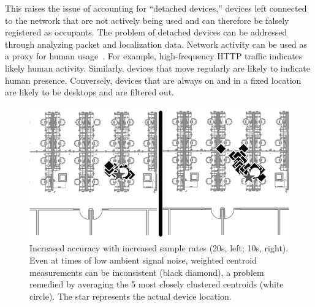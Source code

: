 This raises the issue of accounting for ``detached devices,'' devices left connected to the network that are not actively being used and can therefore be falsely registered as occupants. The problem of detached devices can be addressed through analyzing packet and localization data. Network activity can be used as a proxy for human usage~\cite{Nedevschi2009}. For example, high-frequency HTTP traffic indicates likely human activity. Similarly, devices that move regularly are likely to indicate human presence. Conversely, devices that are always on and in a fixed location are likely to be desktops and are filtered out.



\begin{figure}[htb]
\begin{center}
\includegraphics[width=.7\linewidth]{figs/samplesize}
\end{center}
\caption{Increased accuracy with increased sample rates (20s, left; 10s, right). Even at times of low ambient signal noise, weighted centroid measurements can be inconsistent (black diamond), a problem remedied by averaging the 5 most closely clustered centroids (white circle). The star represents the actual device location.}
\label{fig:samplesize}
\end{figure}

